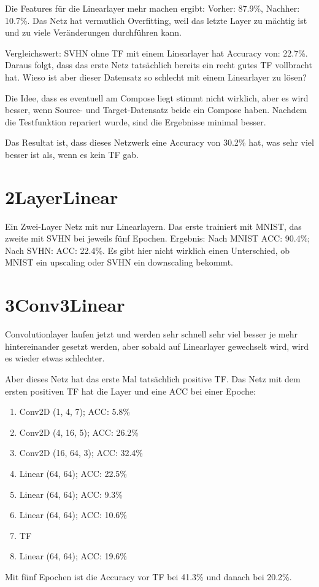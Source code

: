     Die Features für die Linearlayer mehr machen ergibt: 
    Vorher: 87.9\%, Nachher: 10.7\%. Das Netz hat vermutlich Overfitting, weil das 
    letzte Layer zu mächtig ist und zu viele Veränderungen durchführen kann. 

    Vergleichswert: SVHN ohne TF mit einem Linearlayer hat Accuracy von: 22.7\%.
    Daraus folgt, dass das erste Netz tatsächlich bereits ein recht gutes TF vollbracht hat. 
    Wieso ist aber dieser Datensatz so schlecht mit einem Linearlayer zu lösen?

    Die Idee, dass es eventuell am Compose liegt stimmt nicht wirklich, aber es wird besser, 
    wenn Source- und Target-Datensatz beide ein Compose haben.
    Nachdem die Testfunktion repariert wurde, sind die Ergebnisse minimal besser. 

    Das Resultat ist, dass dieses Netzwerk eine Accuracy von 30.2\% hat, was sehr viel 
    besser ist als, wenn es kein TF gab.

\section{2LayerLinear}
    Ein Zwei-Layer Netz mit nur Linearlayern. Das erste trainiert mit MNIST, das zweite 
    mit SVHN bei jeweils fünf Epochen. Ergebnis: Nach MNIST ACC: 90.4\%; Nach SVHN: ACC: 22.4\%. 
    Es gibt hier nicht wirklich einen Unterschied, ob MNIST ein upscaling oder SVHN ein downscaling 
    bekommt.

\section{3Conv3Linear}
    Convolutionlayer laufen jetzt und werden sehr schnell sehr viel besser je mehr hintereinander 
    gesetzt werden, aber sobald auf Linearlayer gewechselt wird, wird es wieder etwas schlechter.

    Aber dieses Netz hat das erste Mal tatsächlich positive TF. Das Netz mit dem ersten 
    positiven TF hat die Layer und eine ACC bei einer Epoche: 
    \begin{enumerate}
        \item Conv2D (1, 4, 7); ACC: 5.8\%
        \item Conv2D (4, 16, 5); ACC: 26.2\%
        \item Conv2D (16, 64, 3); ACC: 32.4\%
        \item Linear (64, 64); ACC: 22.5\%
        \item Linear (64, 64); ACC: 9.3\%
        \item Linear (64, 64); ACC: 10.6\%
        \item TF
        \item Linear (64, 64); ACC: 19.6\%
    \end{enumerate}

    Mit fünf Epochen ist die Accuracy vor TF bei 41.3\% und danach bei 20.2\%.

